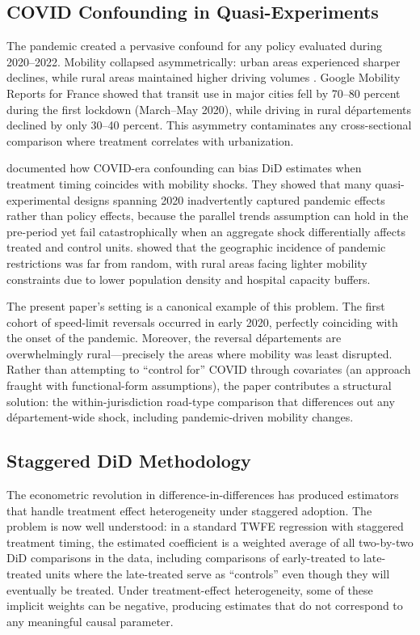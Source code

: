 \documentclass[12pt]{article}
\begin{document}
\subsection{COVID Confounding in Quasi-Experiments}

The pandemic created a pervasive confound for any policy evaluated during 2020--2022. Mobility collapsed asymmetrically: urban areas experienced sharper declines, while rural areas maintained higher driving volumes \citep{brodeur2021}. Google Mobility Reports for France showed that transit use in major cities fell by 70--80 percent during the first lockdown (March--May 2020), while driving in rural d\'{e}partements declined by only 30--40 percent. This asymmetry contaminates any cross-sectional comparison where treatment correlates with urbanization.

\citet{goodman2021covid} documented how COVID-era confounding can bias DiD estimates when treatment timing coincides with mobility shocks. They showed that many quasi-experimental designs spanning 2020 inadvertently captured pandemic effects rather than policy effects, because the parallel trends assumption can hold in the pre-period yet fail catastrophically when an aggregate shock differentially affects treated and control units. \citet{fetzer2020} showed that the geographic incidence of pandemic restrictions was far from random, with rural areas facing lighter mobility constraints due to lower population density and hospital capacity buffers.

The present paper's setting is a canonical example of this problem. The first cohort of speed-limit reversals occurred in early 2020, perfectly coinciding with the onset of the pandemic. Moreover, the reversal d\'{e}partements are overwhelmingly rural---precisely the areas where mobility was least disrupted. Rather than attempting to ``control for'' COVID through covariates (an approach fraught with functional-form assumptions), the paper contributes a structural solution: the within-jurisdiction road-type comparison that differences out any d\'{e}partement-wide shock, including pandemic-driven mobility changes.

\subsection{Staggered DiD Methodology}

The econometric revolution in difference-in-differences has produced estimators that handle treatment effect heterogeneity under staggered adoption. The problem is now well understood: in a standard TWFE regression with staggered treatment timing, the estimated coefficient is a weighted average of all two-by-two DiD comparisons in the data, including comparisons of early-treated to late-treated units where the late-treated serve as ``controls'' even though they will eventually be treated. Under treatment-effect heterogeneity, some of these implicit weights can be negative, producing estimates that do not correspond to any meaningful causal parameter.
\end{document}
